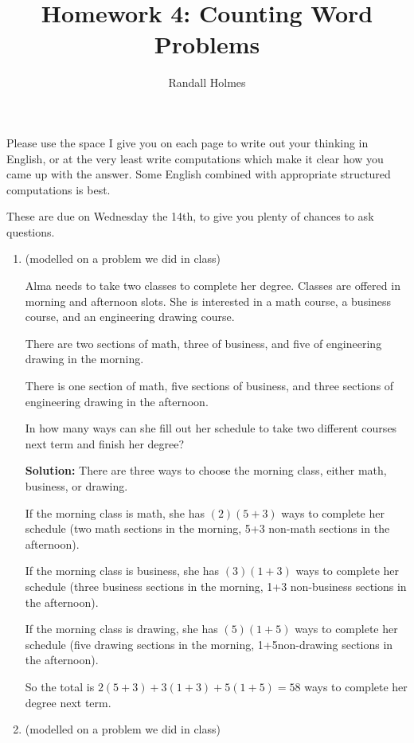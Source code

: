 \documentclass[12pt]{article}
\title{Homework 4:  Counting Word Problems}
\author{Randall Holmes}
\begin{document}
\maketitle

Please use the space I give you on each page to write out your thinking in English, or at the very least write computations which make it clear how you came up with the answer.  Some English combined with appropriate structured computations is best.

These are due on Wednesday the 14th, to give you plenty of chances to ask questions.

\newpage

\begin{enumerate}

\item (modelled on a problem we did in class)

Alma needs to take two classes to complete her degree.  Classes are offered in morning and afternoon slots.  She is interested in a math course, a business course, and an engineering drawing course.

There are two sections of math, three of business, and five of engineering drawing in the morning.

There is one section of math, five sections of business, and three sections of engineering drawing in the afternoon.

In how many ways can she fill out her schedule to take two different courses next term and finish her degree?

{\bf Solution:}  There are three ways to choose the morning class, either math, business, or drawing.

If the morning class is math, she has $(2)(5+3)$ ways to complete her schedule (two math sections in the morning,
5+3 non-math sections in the afternoon).

If the morning class is business, she has $(3)(1+3)$ ways to complete her schedule (three business sections in the morning,
1+3 non-business sections in the afternoon).

If the morning class is drawing, she has $(5)(1+5)$ ways to complete her schedule (five drawing sections in the morning,
1+5non-drawing sections in the afternoon).

So the total is $2(5+3) + 3(1+3) + 5(1+5)= 58$ ways to complete her degree next term.

\newpage

\item (modelled on a problem we did in class)


\end{enumerate}
\end{document}
